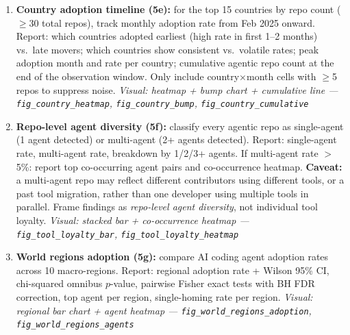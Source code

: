 \documentclass[9pt,a4paper]{article}
\begin{document}
\begin{enumerate}[leftmargin=1.5em,itemsep=1pt,topsep=2pt]
        Report: (a) trailer timing breakdown --- day-1 ($\leq$7\,d) / early (8--30\,d) /
        late ($>$30\,d) with counts and \%; median days to first trailer; median \% of
        commits before the first AI commit. (b) adoption patterns --- trailer-only /
        AI-native (config + trailer $\leq$7\,d) / config-first / trailer-first with counts
        and \%. (c) config files found: which files, how many repos, median commit day
        for config file vs first trailer.
        \textit{Visual: stacked bar + pie --- \texttt{fig\_adoption\_pattern}, \texttt{fig\_adoption\_timing}}
  \item \textbf{Country adoption timeline (5e):} for the top 15 countries by repo count
        ($\geq$30 total repos), track monthly adoption rate from Feb 2025 onward.
        Report: which countries adopted earliest (high rate in first 1--2 months) vs.\ late
        movers; which countries show consistent vs.\ volatile rates; peak adoption month and
        rate per country; cumulative agentic repo count at the end of the observation window.
        Only include country$\times$month cells with $\geq$5 repos to suppress noise.
        \textit{Visual: heatmap + bump chart + cumulative line ---
          \texttt{fig\_country\_heatmap}, \texttt{fig\_country\_bump}, \texttt{fig\_country\_cumulative}}
  \item \textbf{Repo-level agent diversity (5f):} classify every agentic repo as
        single-agent (1 agent detected) or multi-agent (2+ agents detected).
        Report: single-agent rate, multi-agent rate, breakdown by 1/2/3+ agents.
        If multi-agent rate $>$5\%: report top co-occurring agent pairs and co-occurrence heatmap.
        \textbf{Caveat:} a multi-agent repo may reflect different contributors using different
        tools, or a past tool migration, rather than one developer using multiple tools in
        parallel. Frame findings as \emph{repo-level agent diversity}, not individual tool
        loyalty.
        \textit{Visual: stacked bar + co-occurrence heatmap ---
          \texttt{fig\_tool\_loyalty\_bar}, \texttt{fig\_tool\_loyalty\_heatmap}}
  \item \textbf{World regions adoption (5g):} compare AI coding agent adoption rates across
        10 macro-regions. Report: regional adoption rate + Wilson 95\% CI, chi-squared
        omnibus $p$-value, pairwise Fisher exact tests with BH FDR correction,
        top agent per region, single-homing rate per region.
        \textit{Visual: regional bar chart + agent heatmap ---
          \texttt{fig\_world\_regions\_adoption}, \texttt{fig\_world\_regions\_agents}}

\end{enumerate}
\end{document}
